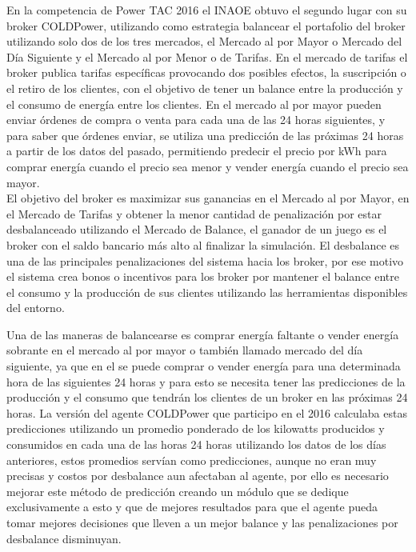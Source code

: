 En la competencia de Power TAC 2016 el INAOE obtuvo el segundo lugar con su broker COLDPower, utilizando como estrategia balancear el portafolio del broker utilizando solo dos de los tres mercados, el Mercado al por Mayor o Mercado del Día Siguiente y el Mercado al por Menor o de Tarifas. 
En el mercado de tarifas el broker publica tarifas específicas provocando dos posibles efectos, la suscripción o el retiro de los clientes, con el objetivo de tener un balance entre la producción y el consumo de energía entre los clientes. 
En el mercado al por mayor pueden enviar órdenes de compra o venta para cada una de las 24 horas siguientes, y para saber que órdenes enviar, se utiliza una predicción de las próximas 24 horas a partir de los datos del pasado, permitiendo predecir el precio por kWh para comprar energía cuando el precio sea menor y vender energía cuando el precio sea mayor.
\\
 
El objetivo del broker es maximizar sus ganancias en el  Mercado al por Mayor, en el Mercado de Tarifas y obtener la menor cantidad de penalización por estar desbalanceado utilizando el Mercado de Balance, el ganador de un juego es el broker con el saldo bancario más alto al finalizar la simulación. 
El desbalance es una de las principales penalizaciones del sistema hacia los broker, por ese motivo el sistema crea bonos o incentivos para los broker por mantener el balance entre el consumo y la producción de sus clientes utilizando las herramientas disponibles del entorno.

Una de las maneras de balancearse es comprar energía faltante o vender energía sobrante en el mercado al por mayor o también llamado mercado del día siguiente, ya que en el se puede comprar o vender energía para una determinada hora de las siguientes 24 horas y para esto se necesita tener las predicciones de la producción y el consumo que tendrán los clientes de un broker en las próximas 24 horas.
La versión del agente COLDPower que participo en el 2016 calculaba estas predicciones utilizando un promedio ponderado de los kilowatts producidos y consumidos en cada una de las horas 24 horas utilizando los datos de los días anteriores, estos promedios servían como predicciones, aunque no eran muy precisas y costos por desbalance aun afectaban al agente, por ello es necesario mejorar este método de predicción creando un módulo que se dedique exclusivamente a esto y que de mejores resultados para que el agente pueda tomar mejores decisiones que lleven a un mejor balance y las penalizaciones por desbalance disminuyan.

